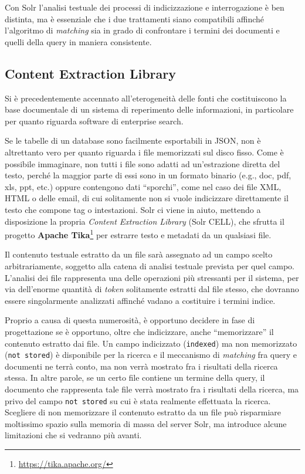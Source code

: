 \vspace{1em}

Con Solr l’analisi testuale dei processi di indicizzazione e interrogazione è ben distinta, ma è essenziale che i due trattamenti siano compatibili affinché l’algoritmo di \textit{matching} sia in grado di confrontare i termini dei documenti e quelli della query in maniera consistente.



\subsection{Content Extraction Library}
\label{sec:solrcell}

Si è precedentemente accennato all’eterogeneità delle fonti che costituiscono la base documentale di un sistema di reperimento delle informazioni, in particolare per quanto riguarda software di enterprise search. 

Se le tabelle di un database sono facilmente esportabili in JSON, non è altrettanto vero per quanto riguarda i file memorizzati sul disco fisso. Come è possibile immaginare, non tutti i file sono adatti ad un’estrazione diretta del testo, perché la maggior parte di essi sono in un formato binario (e.g., doc, pdf, xls, ppt, etc.) oppure contengono dati “sporchi”, come nel caso dei file XML, HTML o delle email, di cui solitamente non si vuole indicizzare direttamente il testo che compone tag o intestazioni. Solr ci viene in aiuto, mettendo a disposizione la propria \textit{Content Extraction Library} (Solr CELL), che sfrutta il progetto \textbf{Apache Tika}\footnote{\url{https://tika.apache.org/}} per estrarre testo e metadati da un qualsiasi file.

\vspace{1em}

Il contenuto testuale estratto da un file sarà assegnato ad un campo scelto arbitrariamente, soggetto alla catena di analisi testuale prevista per quel campo. L’analisi dei file rappresenta una delle operazioni più stressanti per il sistema, per via dell’enorme quantità di \textit{token} solitamente estratti dal file stesso, che dovranno essere singolarmente analizzati affinché vadano a costituire i termini indice.

Proprio a causa di questa numerosità, è opportuno decidere in fase di progettazione se è opportuno, oltre che indicizzare, anche “memorizzare” il contenuto estratto dai file. Un campo indicizzato (\texttt{indexed}) ma non memorizzato (\texttt{not stored}) è disponibile per la ricerca e il meccanismo di \textit{matching} fra query e documenti ne terrà conto, ma non verrà mostrato fra i risultati della ricerca stessa. In altre parole, se un certo file contiene un termine della query, il documento che rappresenta tale file verrà mostrato fra i risultati della ricerca, ma privo del campo \texttt{not stored} su cui è stata realmente effettuata la ricerca. Scegliere di non memorizzare il contenuto estratto da un file può risparmiare moltissimo spazio sulla memoria di massa del server Solr, ma introduce alcune limitazioni che si vedranno più avanti.





